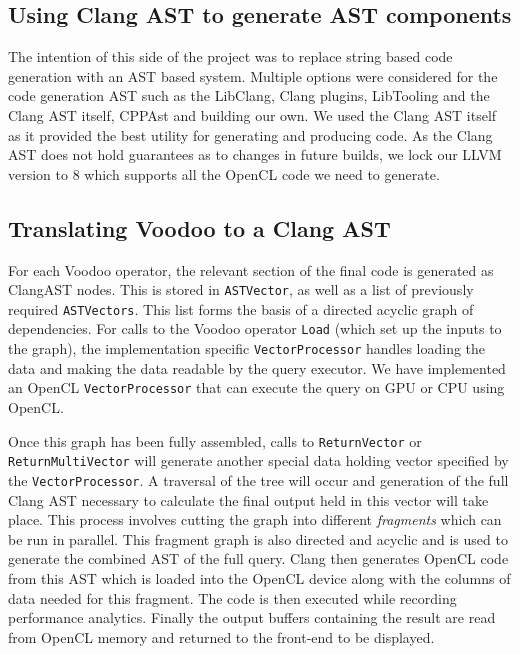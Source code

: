 \subsection{Using Clang AST to generate AST components}

The intention of this side of the project was to replace string based code generation with an AST based system. Multiple options were considered for the code generation AST such as the LibClang, Clang plugins, LibTooling and the Clang AST itself, CPPAst and building our own. We used the Clang AST itself as it provided the best utility for generating and producing code. As the Clang AST does not hold guarantees as to changes in future builds, we lock our LLVM version to 8 which supports all the OpenCL code we need to generate.

\subsection{Translating Voodoo to a Clang AST} \label{voodoo-to-ast}

For each Voodoo operator, the relevant section of the final code is generated as ClangAST nodes. This is stored in \texttt{ASTVector}, as well as a list of previously required \texttt{ASTVectors}. This list forms the basis of a directed acyclic graph of dependencies. For calls to the Voodoo operator \texttt{Load} (which set up the inputs to the graph), the implementation specific \texttt{VectorProcessor} handles loading the data and making the data readable by the query executor. We have implemented an OpenCL \texttt{VectorProcessor} that can execute the query on GPU or CPU using OpenCL.

Once this graph has been fully assembled, calls to \texttt{ReturnVector} or \texttt{ReturnMultiVector} will generate another special data holding vector specified by the \texttt{VectorProcessor}. A traversal of the tree will occur and generation of the full Clang AST necessary to calculate the final output held in this vector will take place. This process involves cutting the graph into different \emph{fragments} which can be run in parallel. This fragment graph is also directed and acyclic and is used to generate the combined AST of the full query. Clang then generates OpenCL code from this AST which is loaded into the OpenCL device along with the columns of data needed for this fragment. The code is then executed while recording performance analytics. Finally the output buffers containing the result are read from OpenCL memory and returned to the front-end to be displayed.


